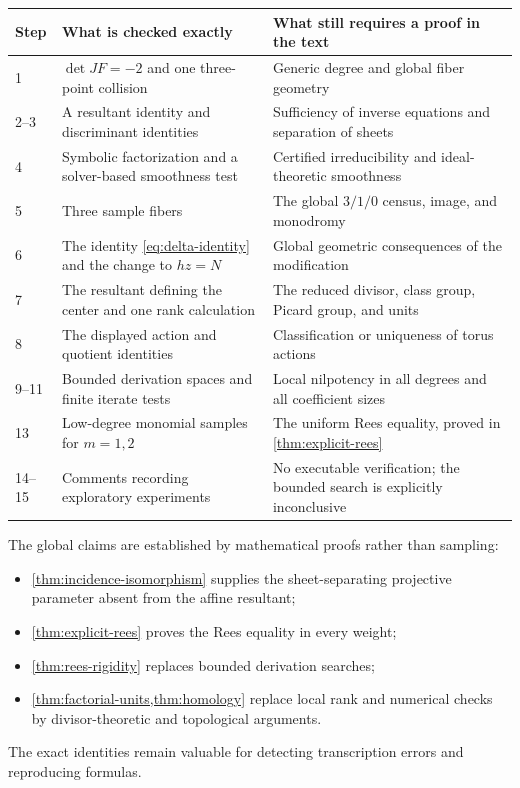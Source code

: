 \begin{center}
\begin{tabular}{@{}p{}p{}p{}@{}}
\toprule
Step & What is checked exactly & What still requires a proof in the text \\
\midrule
1 & $\det JF=-2$ and one three-point collision & Generic degree and global fiber geometry \\
2--3 & A resultant identity and discriminant identities & Sufficiency of inverse equations and separation of sheets \\
4 & Symbolic factorization and a solver-based smoothness test & Certified irreducibility and ideal-theoretic smoothness \\
5 & Three sample fibers & The global $3/1/0$ census, image, and monodromy \\
6 & The identity \eqref{eq:delta-identity} and the change to $hz=N$ & Global geometric consequences of the modification \\
7 & The resultant defining the center and one rank calculation & The reduced divisor, class group, Picard group, and units \\
8 & The displayed action and quotient identities & Classification or uniqueness of torus actions \\
9--11 & Bounded derivation spaces and finite iterate tests & Local nilpotency in all degrees and all coefficient sizes \\
13 & Low-degree monomial samples for $m=1,2$ & The uniform Rees equality, proved in \cref{thm:explicit-rees} \\
14--15 & Comments recording exploratory experiments & No executable verification; the bounded search is explicitly inconclusive \\
\bottomrule
\end{tabular}
\end{center}

\begin{observation}\label{obs:proofs-beyond-script}
The global claims are established by mathematical proofs rather than sampling:
\begin{itemize}
\item \cref{thm:incidence-isomorphism} supplies the sheet-separating projective parameter absent from the affine resultant;
\item \cref{thm:explicit-rees} proves the Rees equality in every weight;
\item \cref{thm:rees-rigidity} replaces bounded derivation searches;
\item \cref{thm:factorial-units,thm:homology} replace local rank and numerical checks by divisor-theoretic and topological arguments.
\end{itemize}
The exact identities remain valuable for detecting transcription errors and reproducing formulas.
\end{observation}


